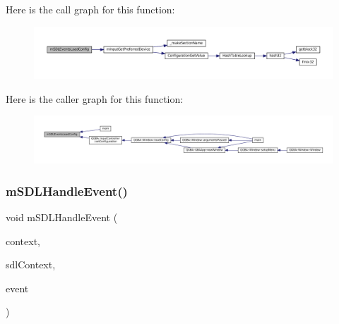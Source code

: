Here is the call graph for this function\+:
\nopagebreak
\begin{figure}[H]
\begin{center}
\leavevmode
\includegraphics[width=350pt]{sdl-events_8h_a3c3efdcde7fe2309c3858a37ad72c0b3_cgraph}
\end{center}
\end{figure}
Here is the caller graph for this function\+:
\nopagebreak
\begin{figure}[H]
\begin{center}
\leavevmode
\includegraphics[width=350pt]{sdl-events_8h_a3c3efdcde7fe2309c3858a37ad72c0b3_icgraph}
\end{center}
\end{figure}
\mbox{\label{sdl-events_8h_a32623e2272fd40a24e3941e351a273a4}} 
\subsubsection{\texorpdfstring{m\+S\+D\+L\+Handle\+Event()}{mSDLHandleEvent()}}
{\footnotesize\ttfamily void m\+S\+D\+L\+Handle\+Event (\begin{DoxyParamCaption}\item[{struct m\+Core\+Thread $\ast$}]{context,  }\item[{struct \mbox{\hyperlink{sdl-events_8h_structm_s_d_l_player}{m\+S\+D\+L\+Player}} $\ast$}]{sdl\+Context,  }\item[{const union S\+D\+L\+\_\+\+Event $\ast$}]{event }\end{DoxyParamCaption})}

